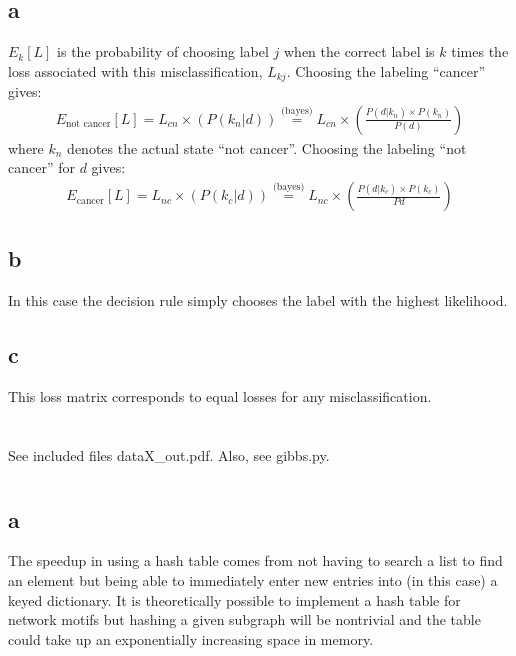 \documentclass[12pt,draft,a4paper]{article}
\begin{document}
\subsection*{a}
$E_k[L]$ is the probability of choosing label $j$ when the correct label is $k$ times the loss associated with this misclassification, $L_{kj}$. Choosing the labeling ``cancer'' gives:
\begin{align*}
E_{\text{not cancer}}[L] = L_{cn}\times\left(P(k_{n}|d)\right) \stackrel{\text{(bayes})}{=}L_{cn}\times \left(\frac{ P(d|k_n)\times P(k_n)}{P(d)}\right)
\end{align*}
where $k_n$ denotes the actual state ``not cancer''. Choosing the labeling ``not cancer'' for $d$ gives:
\begin{align*}
E_{\text{cancer}}[L] = L_{nc}\times\left(P(k_c|d)\right) \stackrel{\text{(bayes)}}{=}
L_{nc}\times \left(\frac{P(d|k_c) \times P(k_c)}{P{d}}\right)
\end{align*}

\subsection*{b}
In this case the decision rule simply chooses the label with the highest likelihood.

\subsection*{c}
This loss matrix corresponds to equal losses for any misclassification.


\pagebreak
\section{}
See included files dataX\_out.pdf.
Also, see gibbs.py.          
          
\pagebreak
\section{}
\subsection*{a}
The speedup in using a hash table comes from not having to search a list to find an element but being able to immediately enter new entries into (in this case) a keyed dictionary. It is theoretically possible to implement a hash table for network motifs but  hashing a given subgraph will be nontrivial and the table could take up an exponentially increasing space in memory.
\end{document}
